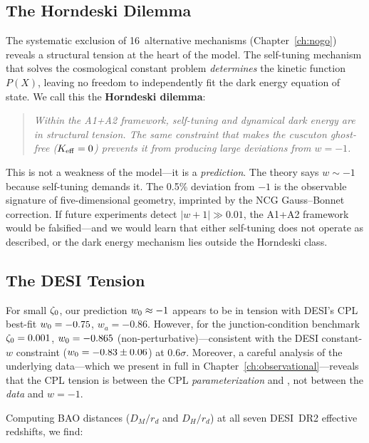 \subsection{The Horndeski Dilemma}
\label{sec:1-horndeski-dilemma}

The systematic exclusion of 16~alternative mechanisms (Chapter~\ref{ch:nogo}) reveals a structural tension at the heart of the model. The self-tuning mechanism that solves the cosmological constant problem \emph{determines} the kinetic function $P(X)$, leaving no freedom to independently fit the dark energy equation of state. We call this the \textbf{Horndeski dilemma}:

\begin{quote}
\itshape Within the A1+A2 framework, self-tuning and dynamical dark energy are in structural tension. The same constraint that makes the cuscuton ghost-free ($K_{\mathrm{eff}} = 0$) prevents it from producing large deviations from $w = -1$.
\end{quote}

This is not a weakness of the model---it is a \emph{prediction}. The theory says $w \sim -1$ because self-tuning demands it. The 0.5\% deviation from $-1$ is the observable signature of five-dimensional geometry, imprinted by the NCG Gauss--Bonnet correction. If future experiments detect $|w + 1| \gg 0.01$, the A1+A2 framework would be falsified---and we would learn that either self-tuning does not operate as described, or the dark energy mechanism lies outside the Horndeski class.

\subsection{The DESI Tension}
\label{sec:1-desi-tension}

For small $\zeta_0$, our prediction $w_0 \approx -1$ appears to be in tension with DESI's CPL best-fit $w_0 = -0.75$, $w_a = -0.86$. However, for the junction-condition benchmark $\zeta_0 = 0.001$, $w_0 = -0.865$ (non-perturbative)---consistent with the DESI constant-$w$ constraint ($w_0 = -0.83 \pm 0.06$) at $0.6\sigma$. Moreover, a careful analysis of the underlying data---which we present in full in Chapter~\ref{ch:observational}---reveals that the CPL tension is between the CPL \emph{parameterization} and \LCDM, not between the \emph{data} and $w = -1$.

Computing BAO distances ($D_M/r_d$ and $D_H/r_d$) at all seven DESI~DR2 effective redshifts, we find:

